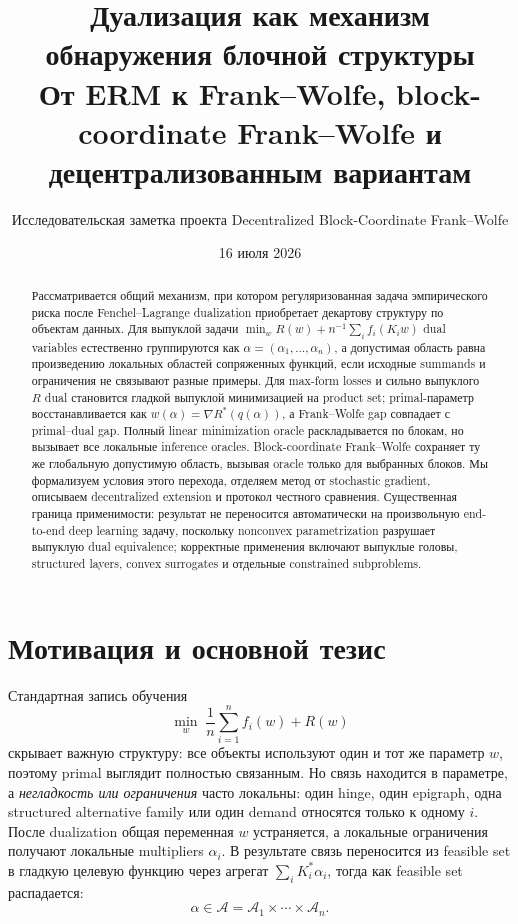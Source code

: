 \documentclass[11pt,a4paper]{article}
\title{\bfseries Дуализация как механизм обнаружения блочной структуры\\[0.25em]
\large От ERM к Frank--Wolfe, block-coordinate Frank--Wolfe и децентрализованным вариантам}
\author{Исследовательская заметка проекта Decentralized Block-Coordinate Frank--Wolfe}
\date{16 июля 2026}
\newcommand{\A}{\mathcal{A}}
\begin{document}
\maketitle

\begin{abstract}
Рассматривается общий механизм, при котором регуляризованная задача эмпирического риска после Fenchel--Lagrange dualization приобретает декартову структуру по объектам данных. Для выпуклой задачи
\(
\min_w R(w)+n^{-1}\sum_i f_i(K_iw)
\)
dual variables естественно группируются как \(\alpha=(\alpha_1,\ldots,\alpha_n)\), а допустимая область равна произведению локальных областей сопряженных функций, если исходные summands и ограничения не связывают разные примеры. Для max-form losses и сильно выпуклого \(R\) dual становится гладкой выпуклой минимизацией на product set; primal-параметр восстанавливается как \(w(\alpha)=\nabla R^*(q(\alpha))\), а Frank--Wolfe gap совпадает с primal--dual gap. Полный linear minimization oracle раскладывается по блокам, но вызывает все локальные inference oracles. Block-coordinate Frank--Wolfe сохраняет ту же глобальную допустимую область, вызывая oracle только для выбранных блоков. Мы формализуем условия этого перехода, отделяем метод от stochastic gradient, описываем decentralized extension и протокол честного сравнения. Существенная граница применимости: результат не переносится автоматически на произвольную end-to-end deep learning задачу, поскольку nonconvex parametrization разрушает выпуклую dual equivalence; корректные применения включают выпуклые головы, structured layers, convex surrogates и отдельные constrained subproblems.
\end{abstract}

\section{Мотивация и основной тезис}

Стандартная запись обучения
\begin{equation}
  \label{eq:erm-informal}
  \min_w \; \frac1n\sum_{i=1}^n f_i(w)+R(w)
\end{equation}
скрывает важную структуру: все объекты используют один и тот же параметр \(w\), поэтому primal выглядит полностью связанным. Но связь находится в параметре, а \emph{негладкость или ограничения} часто локальны: один hinge, один epigraph, одна structured alternative family или один demand относятся только к одному \(i\). После dualization общая переменная \(w\) устраняется, а локальные ограничения получают локальные multipliers \(\alpha_i\). В результате связь переносится из feasible set в гладкую целевую функцию через агрегат \(\sum_i K_i^*\alpha_i\), тогда как feasible set распадается:
\[
  \alpha\in\A=\A_1\times\cdots\times\A_n.
\]
\end{document}
